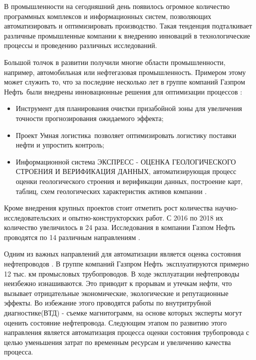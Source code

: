 \documentclass[a4paper,article,14pt]{extarticle}
\begin{document}


\tableofcontents
\pagebreak


В промышленности на сегодняшний день появилось огромное количество программных комплексов и 
информационных систем, позволяющих автоматизировать и оптимизировать производство. 
Такая тенденция подталкивает различные промышленные компании к внедрению инноваций 
в технологические процессы и проведению различных исследований. 

Большой толчок в развитии получили многие области промышленности, например, автомобильная или нефтегазовая промышленность. 
Примером этому может служить то, что за последние несколько лет в группе компаний \flqq Газпром Нефть\frqq\, были 
внедрены инновационные решения для оптимизации процессов \cite{j1}:
\begin{itemize}
    \item Инструмент для планирования очистки призабойной зоны для увеличения точности прогнозирования ожидаемого эффекта;
    \item Проект \flqq Умная логистика\frqq\, позволяет оптимизировать логистику поставки нефти и упростить контроль;
    \item Информационной система \flqq ЭКСПРЕСС - ОЦЕНКА ГЕОЛОГИЧЕСКОГО СТРОЕНИЯ И ВЕРИФИКАЦИЯ ДАННЫХ\frqq, 
    автоматизирующая процесс оценки геологического строения и верификации данных, построение карт, 
    таблиц, схем геологических характеристик активов компании \cite{s1}.
\end{itemize}

Кроме внедрения крупных проектов стоит отметить рост количества научно-исследовательских и опытно-конструкторских работ. 
С 2016 по 2018 их количество увеличилось в 24 раза. Исследования в компании 
\flqq Газпом Нефть\frqq\, проводятся по 14 различным направлениям \cite{j2}.

Одним из важных направлений для автоматизации является оценка состояния нефтепроводов \cite{a1}.
В группе компаний \flqq Газпром Нефть\frqq\, эксплуатируются примерно 12 тыс. км промысловых трубопроводов. В ходе эксплуатации нефтепроводы неизбежно изнашиваются. 
Это приводит к прорывам и утечкам нефти, что вызывает отрицательные экономические, экологические и репутационные эффекты. 
Во избежание этого проводятся работы по внутритрубной диагностике(ВТД) - съемке магнитограмм, на основе которых эксперты могут оценить состояние нефтепровода. 
Следующим этапом по развитию этого направления является автоматизация процесса оценки состояния трубопровода 
с целью уменьшения затрат по временным ресурсам и увеличению качества процесса.
\end{document}
